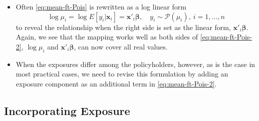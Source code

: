 \documentclass[ignorenonframetext,]{beamer}
\begin{document}
\begin{frame}[allowframebreaks]
\framebreak

\begin{itemize} 
\item Often \eqref{eq:mean-ft-Pois} is rewritten as a log linear form
\begin{equation} \label{eq:mean-ft-Pois-2}
\log \mu_i=\log E{[y_i|\mathbf{ x}_i]}=\mathbf{ x}'_i \boldsymbol \beta, \quad y_i \sim \mathcal{P}(\mu_i), \ i=1, \ldots, n
\end{equation}
to reveal the relationship when the right side is set as the linear form, $\mathbf{ x}'_i \boldsymbol \beta$. Again, we see that the  mapping works well as both sides of \eqref{eq:mean-ft-Pois-2}, $\log \mu_i$ and $\mathbf{ x}'_i \boldsymbol \beta$, can now cover all real values. 

\item When the exposures differ among the policyholders, however, as is the case in most practical cases, we need to revise this formulation by adding an exposure component as an additional term in \eqref{eq:mean-ft-Pois-2}.
\end{itemize}


\end{frame}

\subsection{Incorporating Exposure}
\end{document}
